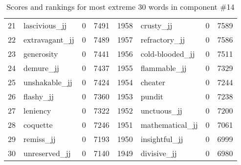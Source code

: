 \begin{table}[tbp]
\begin{tabular}{| rlr@{.}l | rlr@{.}l |}
    21 & lascivious\_jj & 0 & 7491    &    1958 & crusty\_jj & 0 & 7589 \\
    22 & extravagant\_jj & 0 & 7489    &    1957 & refractory\_jj & 0 & 7586 \\
    23 & generosity & 0 & 7441    &    1956 & cold-blooded\_jj & 0 & 7511 \\
    24 & demure\_jj & 0 & 7437    &    1955 & flammable\_jj & 0 & 7329 \\
    25 & unshakable\_jj & 0 & 7424    &    1954 & cheater & 0 & 7244 \\
    26 & flashy\_jj & 0 & 7360    &    1953 & pundit & 0 & 7238 \\
    27 & leniency & 0 & 7322    &    1952 & unctuous\_jj & 0 & 7200 \\
    28 & coquette & 0 & 7246    &    1951 & mathematical\_jj & 0 & 7061 \\
    29 & remiss\_jj & 0 & 7193    &    1950 & insightful\_jj & 0 & 6999 \\
    30 & unreserved\_jj & 0 & 7140    &    1949 & divisive\_jj & 0 & 6980 \\
    \hline
    \end{tabular}
    \caption{Scores and rankings for most extreme 30 words in component \#14} 
\end{table}
\clearpage
